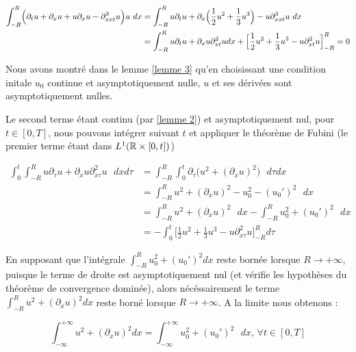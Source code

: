\begin{equation*}
\begin{split}
    \int_{-R}^{R} \Bigl( \partial_t u + \partial_x u + u\partial_xu - \partial_{xxt}^3u \Bigr)u \text{ } dx &= \int_{-R}^{R} u\partial_t u + \partial_x\Bigl( \frac{1}{2}u^2 + \frac{1}{3}u^3 \Bigr) - u\partial_{xxt}^3u \text{ } dx \\
    &= \int_{-R}^{R} u\partial_t u + \partial_xu\partial_{xt}^2u dx + \Big[ \frac{1}{2}u^2 + \frac{1}{3}u^3 - u\partial_{xt}^2 u \Big]_{-R}^{R} = 0
\end{split}
\end{equation*}



Nous avons montré dans le lemme \ref{lemme 3} qu'en choisissant une condition initale $u_0$ continue et asymptotiquement nulle, $u$ et ses dérivées sont asymptotiquement nulles.

Le second terme étant continu (par \ref{lemme 2}) et asymptotiquement nul, pour $t \in [0,T]$, nous pouvons intégrer suivant $t$ et appliquer le théorème de Fubini (le premier terme étant dans $L^1(\mathbb{R}\times[0,t])$)

\begin{equation*}
\begin{split}
    \int_{0}^{t} \int_{-R}^{R} u\partial_\tau u + \partial_xu\partial_{x\tau}^2u \text{ } dx d\tau &= \int_{-R}^{R} \int_{0}^{t} \partial_\tau \big( u^2 + (\partial_x u)^2\big) \text{ } d\tau dx \\
    &= \int_{-R}^{R} u^2 + (\partial_x u)^2 - u_0^2 - (u_0')^2 \text{ } dx  \\
    &= \int_{-R}^{R} u^2 + (\partial_x u)^2 \text{ } dx - \int_{-R}^{R} u_0^2 + (u_0')^2 \text{ } dx \\
    &= - \int_{0}^{t} \Big[ \frac{1}{2}u^2 + \frac{1}{3}u^3 - u\partial_{x\tau}^2 u \Big]_{-R}^{R} d\tau
\end{split}
\end{equation*}

En supposant que l'intégrale $\int_{-R}^{R} u_0^2 + (u_0')^2 dx$ reste bornée lorsque $R \longrightarrow +\infty$, puisque le terme de droite est asymptotiquement nul (et vérifie les hypothèses du théorème de convergence dominée), alors nécéssairement 
le terme $\int_{-R}^{R} u^2 + (\partial_x u)^2 dx$ reste borné lorsque $R \longrightarrow +\infty$. 
A la limite nous obtenons :

$$\int_{-\infty}^{+\infty} u^2 + (\partial_x u)^2 dx = \int_{-\infty}^{+\infty} u_0^2 + (u_0')^2 \text{ } dx \text{, } \forall t \in [0,T]$$


